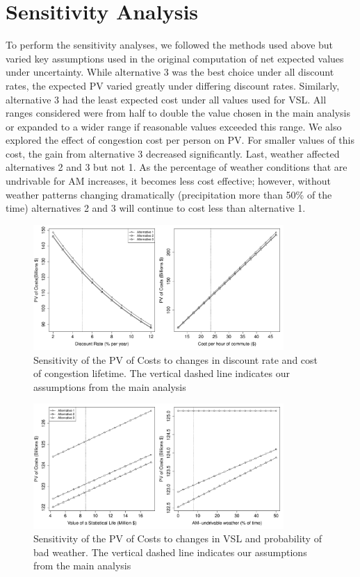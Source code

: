\documentclass[11pt, letterpaper]{article}
\begin{document}
\section{Sensitivity Analysis} \label{sensitivity}

To perform the sensitivity analyses, we followed the methods used
above but varied key assumptions used in the original computation of
net expected values under uncertainty. While alternative 3 was the best choice under all discount
rates, the expected PV varied greatly under differing discount
rates. Similarly, alternative 3 had the least expected cost under
all values used for VSL. All ranges considered were from
half to double the value chosen in the main analysis or expanded to
a wider range if reasonable values exceeded this range.  We also
explored the effect of congestion cost per person on PV. For smaller values
of this cost, the gain from alternative 3 decreased significantly.
Last, weather affected alternatives 2 and 3 but not 1.
As the percentage of weather conditions that are undrivable for AM increases, it becomes 
less cost effective; however, without  weather patterns changing dramatically (precipitation more
than 50\% of the time) alternatives 2 and 3 will continue to cost less
than alternative 1.

\begin{figure}[H]
\centering
\includegraphics[width=0.85\textwidth]{../../R/sensitivity1.pdf}
\caption{Sensitivity of the PV of Costs to changes in 
  discount rate and cost of congestion lifetime. The vertical 
  dashed line indicates our assumptions from the main analysis}
\label{fig:sensitivity1}
\end{figure}

\begin{figure}[H]
\centering
\includegraphics[width=0.85\textwidth]{../../R/sensitivity2.pdf}
\caption{Sensitivity of the PV of Costs to changes in 
  VSL and probability of bad weather. The vertical 
  dashed line indicates our assumptions from the main analysis}
\label{fig:sensitivity2}
\end{figure}
\end{document}
